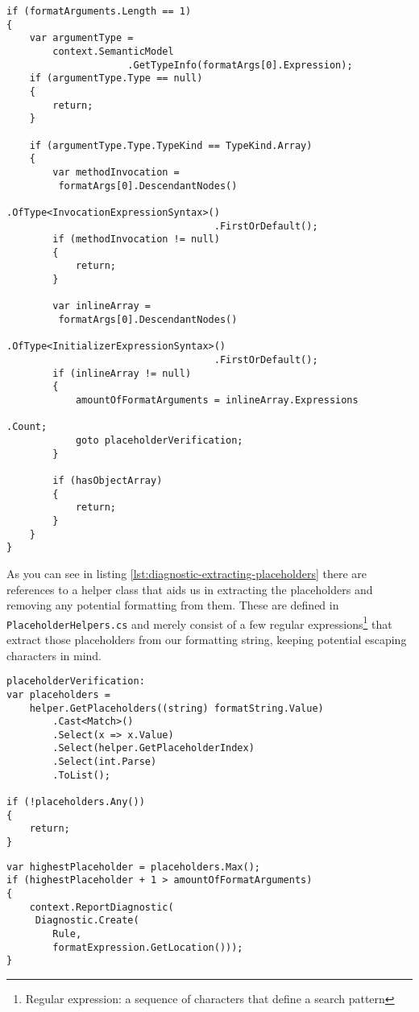 \begin{lstlisting}[label={lst:diagnostic-verifying-inline-array-initialization}]
if (formatArguments.Length == 1)
{
	var argumentType = 
		context.SemanticModel
					 .GetTypeInfo(formatArgs[0].Expression);
	if (argumentType.Type == null)
	{
		return;
	}

	if (argumentType.Type.TypeKind == TypeKind.Array)
	{
		var methodInvocation = 
		 formatArgs[0].DescendantNodes()
									.OfType<InvocationExpressionSyntax>()
									.FirstOrDefault();
		if (methodInvocation != null)
		{
			return;
		}

		var inlineArray = 
		 formatArgs[0].DescendantNodes()
									.OfType<InitializerExpressionSyntax>()
									.FirstOrDefault();
		if (inlineArray != null)
		{
			amountOfFormatArguments = inlineArray.Expressions
																				   .Count;
			goto placeholderVerification;
		}

		if (hasObjectArray)
		{
			return;
		}
	}
}
\end{lstlisting}

As you can see in listing \ref{lst:diagnostic-extracting-placeholders} there are references to a helper class that aids us in extracting the placeholders and removing any potential formatting from them. These are defined in \texttt{PlaceholderHelpers.cs} and merely consist of a few regular expressions\footnote{Regular expression: a sequence of characters that define a search pattern} that extract those placeholders from our formatting string, keeping potential escaping characters in mind.

\begin{lstlisting}[label={lst:diagnostic-extracting-placeholders}]
placeholderVerification:
var placeholders = 
	helper.GetPlaceholders((string) formatString.Value)
        .Cast<Match>()
        .Select(x => x.Value)
        .Select(helper.GetPlaceholderIndex)
        .Select(int.Parse)
        .ToList();

if (!placeholders.Any())
{
	return;
}
\end{lstlisting}

\begin{lstlisting}[label={lst:diagnostic-compare-placeholder-index}]
var highestPlaceholder = placeholders.Max();
if (highestPlaceholder + 1 > amountOfFormatArguments)
{
	context.ReportDiagnostic(
	 Diagnostic.Create(
		Rule, 
		formatExpression.GetLocation()));
}
\end{lstlisting}

